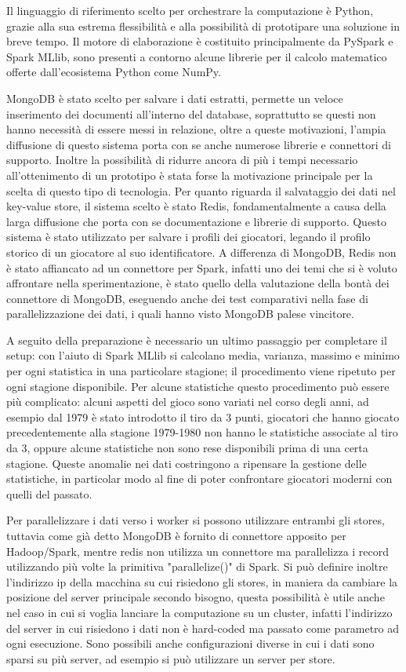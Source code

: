 \documentclass[10pt,a4paper,twocolumn]{article}
\begin{document}
Il linguaggio di riferimento scelto per orchestrare la computazione è Python, grazie alla sua estrema flessibilità e alla possibilità di prototipare una soluzione in breve tempo. Il motore di elaborazione è costituito principalmente da PySpark e Spark MLlib, sono presenti a contorno alcune librerie per il calcolo matematico offerte dall'ecosistema Python come NumPy.

MongoDB è stato scelto per salvare i dati estratti, permette un veloce inserimento dei documenti all'interno del database, soprattutto se questi non hanno necessità di essere messi in relazione, oltre a queste motivazioni, l'ampia diffusione di questo sistema porta con se anche numerose librerie e connettori di supporto.
Inoltre la possibilità di ridurre ancora di più i tempi necessario all'ottenimento di un prototipo è stata forse la motivazione principale per la scelta di questo tipo di tecnologia.
Per quanto riguarda il salvataggio dei dati nel key-value store, il sistema scelto è stato Redis, fondamentalmente a causa della larga diffusione che porta con se documentazione e librerie di supporto. Questo sistema è stato utilizzato per salvare i profili dei giocatori, legando il profilo storico di un giocatore al suo identificatore. A differenza di MongoDB, Redis non è stato affiancato ad un connettore per Spark, infatti uno dei temi che si è voluto affrontare nella sperimentazione, è stato quello della valutazione della bontà dei connettore di MongoDB, eseguendo anche dei test comparativi nella fase di parallelizzazione dei dati, i quali hanno visto MongoDB palese vincitore.

A seguito della preparazione è necessario un ultimo passaggio per completare il setup: con l'aiuto di Spark MLlib si calcolano media, varianza, massimo e minimo per ogni statistica in una particolare stagione; il procedimento viene ripetuto per ogni stagione disponibile. Per alcune statistiche questo procedimento può essere più complicato: alcuni aspetti del gioco sono variati nel corso degli anni, ad esempio dal 1979 è stato introdotto il tiro da 3 punti, giocatori che hanno giocato precedentemente alla stagione 1979-1980 non hanno le statistiche associate al tiro da 3, oppure alcune statistiche non sono rese disponibili prima di una certa stagione. Queste anomalie nei dati costringono a ripensare la gestione delle statistiche, in particolar modo al fine di poter confrontare giocatori moderni con quelli del passato.

Per parallelizzare i dati verso i worker si possono utilizzare entrambi gli stores, tuttavia come già detto MongoDB è fornito di connettore apposito per Hadoop/Spark, mentre redis non utilizza un connettore ma parallelizza i record utilizzando più volte la primitiva "parallelize()" di Spark. Si può definire inoltre l'indirizzo ip della macchina su cui risiedono gli stores, in maniera da cambiare la posizione del server principale secondo bisogno, questa possibilità è utile anche nel caso in cui si voglia lanciare la computazione su un cluster, infatti l'indirizzo del server in cui risiedono i dati non è hard-coded ma passato come parametro ad ogni esecuzione. Sono possibili anche configurazioni diverse in cui i dati sono sparsi su più server, ad esempio si può utilizzare un server per store.
\end{document}
